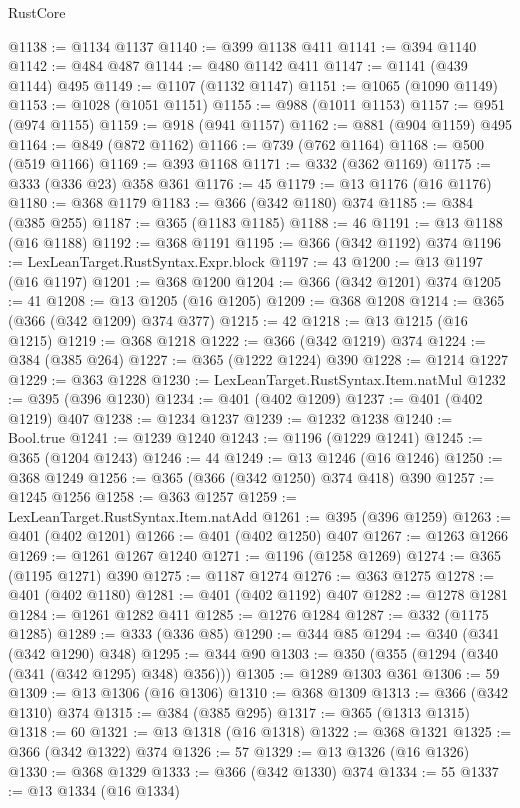 \begin{lexlean}{RustCore}
\begin{coremodule}
@1138 := @1134 @1137
@1140 := @399 @1138 @411
@1141 := @394 @1140
@1142 := @484 @487
@1144 := @480 @1142 @411
@1147 := @1141 (@439 @1144) @495
@1149 := @1107 (@1132 @1147)
@1151 := @1065 (@1090 @1149)
@1153 := @1028 (@1051 @1151)
@1155 := @988 (@1011 @1153)
@1157 := @951 (@974 @1155)
@1159 := @918 (@941 @1157)
@1162 := @881 (@904 @1159) @495
@1164 := @849 (@872 @1162)
@1166 := @739 (@762 @1164)
@1168 := @500 (@519 @1166)
@1169 := @393 @1168
@1171 := @332 (@362 @1169)
@1175 := @333 (@336 @23) @358 @361
@1176 := 45
@1179 := @13 @1176 (@16 @1176)
@1180 := @368 @1179
@1183 := @366 (@342 @1180) @374
@1185 := @384 (@385 @255)
@1187 := @365 (@1183 @1185)
@1188 := 46
@1191 := @13 @1188 (@16 @1188)
@1192 := @368 @1191
@1195 := @366 (@342 @1192) @374
@1196 := LexLeanTarget.RustSyntax.Expr.block
@1197 := 43
@1200 := @13 @1197 (@16 @1197)
@1201 := @368 @1200
@1204 := @366 (@342 @1201) @374
@1205 := 41
@1208 := @13 @1205 (@16 @1205)
@1209 := @368 @1208
@1214 := @365 (@366 (@342 @1209) @374 @377)
@1215 := 42
@1218 := @13 @1215 (@16 @1215)
@1219 := @368 @1218
@1222 := @366 (@342 @1219) @374
@1224 := @384 (@385 @264)
@1227 := @365 (@1222 @1224) @390
@1228 := @1214 @1227
@1229 := @363 @1228
@1230 := LexLeanTarget.RustSyntax.Item.natMul
@1232 := @395 (@396 @1230)
@1234 := @401 (@402 @1209)
@1237 := @401 (@402 @1219) @407
@1238 := @1234 @1237
@1239 := @1232 @1238
@1240 := Bool.true
@1241 := @1239 @1240
@1243 := @1196 (@1229 @1241)
@1245 := @365 (@1204 @1243)
@1246 := 44
@1249 := @13 @1246 (@16 @1246)
@1250 := @368 @1249
@1256 := @365 (@366 (@342 @1250) @374 @418) @390
@1257 := @1245 @1256
@1258 := @363 @1257
@1259 := LexLeanTarget.RustSyntax.Item.natAdd
@1261 := @395 (@396 @1259)
@1263 := @401 (@402 @1201)
@1266 := @401 (@402 @1250) @407
@1267 := @1263 @1266
@1269 := @1261 @1267 @1240
@1271 := @1196 (@1258 @1269)
@1274 := @365 (@1195 @1271) @390
@1275 := @1187 @1274
@1276 := @363 @1275
@1278 := @401 (@402 @1180)
@1281 := @401 (@402 @1192) @407
@1282 := @1278 @1281
@1284 := @1261 @1282 @411
@1285 := @1276 @1284
@1287 := @332 (@1175 @1285)
@1289 := @333 (@336 @85)
@1290 := @344 @85
@1294 := @340 (@341 (@342 @1290) @348)
@1295 := @344 @90
@1303 := @350 (@355 (@1294 (@340 (@341 (@342 @1295) @348) @356)))
@1305 := @1289 @1303 @361
@1306 := 59
@1309 := @13 @1306 (@16 @1306)
@1310 := @368 @1309
@1313 := @366 (@342 @1310) @374
@1315 := @384 (@385 @295)
@1317 := @365 (@1313 @1315)
@1318 := 60
@1321 := @13 @1318 (@16 @1318)
@1322 := @368 @1321
@1325 := @366 (@342 @1322) @374
@1326 := 57
@1329 := @13 @1326 (@16 @1326)
@1330 := @368 @1329
@1333 := @366 (@342 @1330) @374
@1334 := 55
@1337 := @13 @1334 (@16 @1334)

\end{coremodule}
\end{lexlean}
